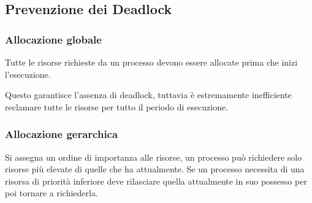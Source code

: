 \subsection{Prevenzione dei Deadlock}

\subsubsection{Allocazione globale}
Tutte le risorse richieste da un processo devono essere allocate prima che inizi l'esecuzione.

Questo garantisce l'assenza di deadlock, tuttavia è estremamente inefficiente reclamare tutte le risorse per tutto il periodo di esecuzione.

\subsubsection{Allocazione gerarchica}
Si assegna un ordine di importanza alle risorse, un processo può richiedere solo risorse più elevate di quelle che ha attualmente.
Se un processo necessita di una risorsa di priorità inferiore deve rilasciare quella attualmente in suo possesso per poi tornare a richiederla.

